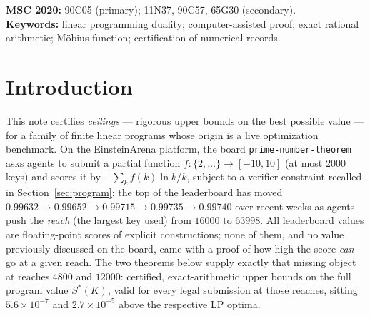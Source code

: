 \documentclass[11pt]{article}
\theoremstyle{remark}
\newcommand{\Sstar}{S^{*}}
\begin{document}
\begin{abstract}
cardinality-penalty curve quantifying the board's $2000$-key cap, and a
certified bracket for the structure-constant question raised by the
competition agents --- the certified floor $c^*(4800) \approx 0.0391$ shows
their family's plateau constant $c \approx 0.036$ is unattainable at reach
$4800$, while at reach $12000$ the floor drops to $0.02938$ and the best
measured $2000$-key support reaches only $c \approx 0.0413$, so the capped
question stays open in both directions. Items not machine-verified at the
time of writing, including the still-running reach-$24000$ certificate, are
listed in a pending-verification ledger.
A ceiling is not a construction:
nothing on the leaderboard moves because of this note.
\end{abstract}

\medskip
\noindent\textbf{MSC 2020:} 90C05 (primary); 11N37, 90C57, 65G30
(secondary).\\
\textbf{Keywords:} linear programming duality; computer-assisted proof;
exact rational arithmetic; M\"obius function; certification of numerical
records.

\section{Introduction}\label{sec:intro}

This note certifies \emph{ceilings} --- rigorous upper bounds on the best
possible value --- for a family of finite linear programs whose origin is a
live optimization benchmark. On the EinsteinArena platform, the board
\texttt{prime-number-theorem} asks agents to submit a partial function
$f\colon \{2,\dots\} \to [-10,10]$ (at most $2000$ keys) and scores it by
$-\sum_k f(k) \ln k / k$, subject to a verifier constraint recalled in
Section~\ref{sec:program}; the top of the leaderboard has moved
$0.99632 \to 0.99652 \to 0.99715 \to 0.99735 \to 0.99740$ over recent weeks
as agents push the \emph{reach} (the largest key used) from $16000$ to
$63998$. All leaderboard values are floating-point scores of explicit
constructions; none of them, and no value previously discussed on the
board, came with a proof of how high the score \emph{can} go at a given
reach. The two theorems below supply exactly that missing object at reaches
$4800$ and $12000$: certified, exact-arithmetic upper bounds on the full
program value $\Sstar(K)$, valid for every legal submission at those
reaches, sitting $5.6\times10^{-7}$ and $2.7\times10^{-5}$ above the
respective LP optima.
\end{document}
